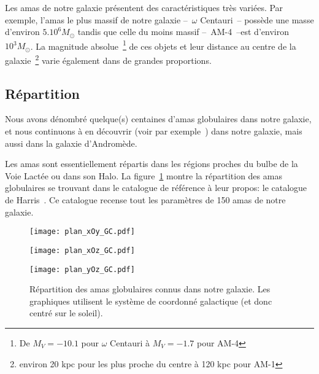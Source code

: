 			Les amas de notre galaxie présentent des caractéristiques très variées. Par
			exemple, l'amas le plus massif de notre galaxie --~$\omega$ Centauri~--
			possède une masse d'environ $5.10^6 M_\odot$ tandis que celle du moins
			massif --~AM-4~--est d'environ $10^3 M_\odot$. La magnitude
			absolue~\footnote{De $M_V = -10.1$ pour $\omega$ Centauri à $M_V = -1.7$
			pour AM-4} de ces objets et leur distance au centre de la
			galaxie~\footnote{environ 20 kpc pour les plus proche du centre à 120 kpc
			pour AM-1} varie également dans de grandes proportions.

		\subsection{Répartition}

			Nous avons dénombré quelque(s) centaines d'amas globulaires dans
			notre galaxie, et nous continuons à en découvrir (voir par
			exemple~\cite{2014ApJ...786L...3L}) dans notre galaxie, mais aussi dans la galaxie d'Andromède.

			Les amas sont essentiellement répartis dans les régions proches du
			bulbe de la Voie Lactée ou dans son Halo.
			La figure~\ref{Fig::Intro::repartition} montre la répartition des amas
			globulaires se trouvant dans le catalogue de référence à leur propos: le
			catalogue de Harris~\cite{Harris}. Ce catalogue recense tout les paramètres
			de 150 amas de notre galaxie.

			\begin{figure}
				\begin{minipage}{0.32\textwidth}
					\begin{center}
						\texttt{[image: plan\_xOy\_GC.pdf]}
					\end{center}
				\end{minipage}\hfill
				\begin{minipage}{0.32\textwidth}
					\begin{center}
						\texttt{[image: plan\_xOz\_GC.pdf]}
					\end{center}
				\end{minipage}\hfill
				\begin{minipage}{0.32\textwidth}
					\begin{center}
						\texttt{[image: plan\_yOz\_GC.pdf]}
					\end{center}
				\end{minipage}
				\caption{\label{Fig::Intro::repartition}Répartition des amas globulaires connus dans notre galaxie. Les graphiques utilisent le système de coordonné galactique (et donc centré sur le soleil).}
			\end{figure}


